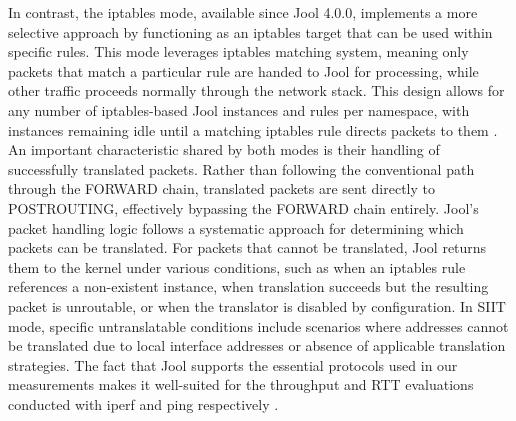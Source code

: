 In contrast, the iptables mode, available since Jool 4.0.0, implements a more selective approach by functioning as an iptables target that can be used within specific rules\cite{jool_introduction}. This mode leverages iptables matching system, meaning only packets that match a particular rule are handed to Jool for processing, while other traffic proceeds normally through the network stack. This design allows for any number of iptables-based Jool instances and rules per namespace, with instances remaining idle until a matching iptables rule directs packets to them \cite{jool_introduction}.
An important characteristic shared by both modes is their handling of successfully translated packets. Rather than following the conventional path through the FORWARD chain, translated packets are sent directly to POSTROUTING, effectively bypassing the FORWARD chain entirely\cite{jool_introduction}.
Jool's packet handling logic follows a systematic approach for determining which packets can be translated. For packets that cannot be translated, Jool returns them to the kernel under various conditions, such as when an iptables rule references a non-existent instance, when translation succeeds but the resulting packet is unroutable, or when the translator is disabled by configuration\cite{jool_introduction}. In SIIT mode, specific untranslatable conditions include scenarios where addresses cannot be translated due to local interface addresses or absence of applicable translation strategies\cite{jool_introduction}.
The fact that Jool supports the essential protocols used in our measurements makes it well-suited for the throughput and RTT evaluations conducted with iperf and ping respectively \cite{jool_introduction}.
